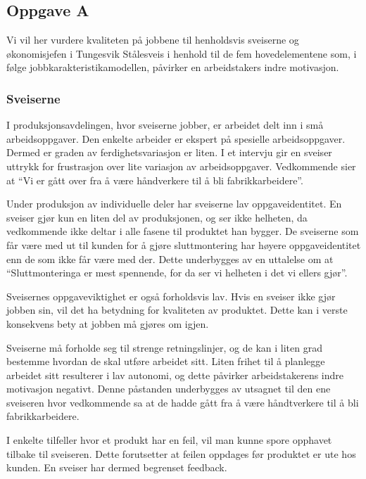 
\subsection{Oppgave A}
Vi vil her vurdere kvaliteten på jobbene til henholdsvis sveiserne og økonomisjefen i Tungesvik Stålesveis i henhold til de fem hovedelementene som, i følge jobbkarakteristikamodellen, påvirker en arbeidstakers indre motivasjon.

\subsubsection{Sveiserne}
I produksjonsavdelingen, hvor sveiserne jobber, er arbeidet delt inn i små arbeidsoppgaver.
Den enkelte arbeider er ekspert på spesielle arbeidsoppgaver.
Dermed er graden av ferdighetsvariasjon er liten.
I et intervju gir en sveiser uttrykk for frustrasjon over lite variasjon av arbeidsoppgaver.
Vedkommende sier at “Vi er gått over fra å være håndverkere til å bli fabrikkarbeidere”.

Under produksjon av individuelle deler har sveiserne lav oppgaveidentitet.
En sveiser gjør kun en liten del av produksjonen, og ser ikke helheten, da vedkommende ikke deltar i alle fasene til produktet han bygger.
De sveiserne som får være med ut til kunden for å gjøre sluttmontering har høyere oppgaveidentitet enn de som ikke får være med der.
Dette underbygges av en uttalelse om at “Sluttmonteringa er mest spennende, for da ser vi helheten i det vi ellers gjør”.

Sveisernes oppgaveviktighet er også forholdsvis lav.
Hvis en sveiser ikke gjør jobben sin, vil det ha betydning for kvaliteten av produktet.
Dette kan i verste konsekvens bety at jobben må gjøres om igjen.

Sveiserne må forholde seg til strenge retningslinjer, og de kan i liten grad bestemme hvordan de skal utføre arbeidet sitt.
Liten frihet til å planlegge arbeidet sitt resulterer i lav autonomi, og dette påvirker arbeidstakerens indre motivasjon negativt.
Denne påstanden underbygges av utsagnet til den ene sveiseren hvor vedkommende sa at de hadde gått fra å være håndtverkere til å bli fabrikkarbeidere.

I enkelte tilfeller hvor et produkt har en feil, vil man kunne spore opphavet tilbake til sveiseren.
Dette forutsetter at feilen oppdages før produktet er ute hos kunden.
En sveiser har dermed begrenset feedback.

